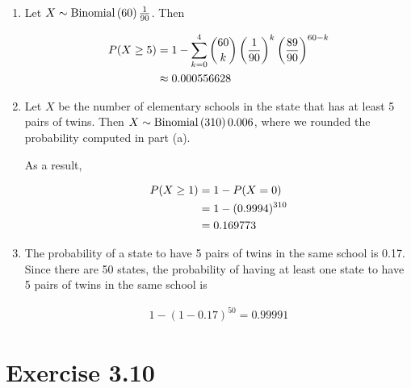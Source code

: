 \documentclass[12pt,letterpaper,reqno]{amsart}
\numberwithin{equation}{subsection}
\begin{document}
\begin{enumerate}[label=(\alph*),leftmargin=*]
    \item Let $X \sim \operatorname{Binomial}\left( {60}\right){\frac{1}{90}}$. Then
    
    \begin{align*}
        {P}\! \left( {X \geq 5} \right) &= 1 - \sum_{k=0}^4 \binom{60}{k} \left( \frac{1}{90} \right)^k \left( \frac{89}{90} \right)^{60-k} \\
        &\approx 0.000556628
    \end{align*}
    
    \item Let $X$ be the number of elementary schools in the state that has at least 5 pairs of twins. Then $X \sim \operatorname{Binomial}\left( {310}\right){0.006}$, where we rounded the probability computed in part (a).
    
    As a result,
    
    \begin{align*}
        {P}\! \left( {X \geq 1} \right) &= 1 - {P}\! \left( {X = 0} \right) \\
                          &= 1 - (0.9994)^{310} \\
                          &= 0.169773
    \end{align*}
    
    \item The probability of a state to have 5 pairs of twins in the same school is 0.17. Since there are 50 states, the probability of having at least one state to have 5 pairs of twins in the same school is
    
    \begin{align*}
        1-(1-0.17)^{50} = 0.99991
    \end{align*}
\end{enumerate}

\newpage
\section{Exercise 3.10}
\end{document}
